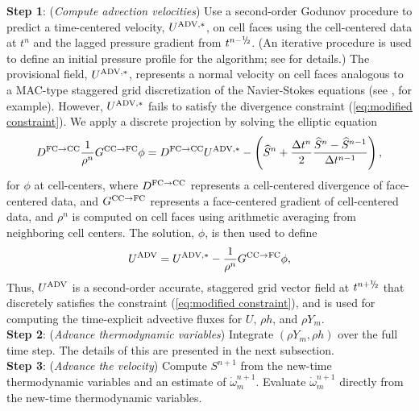 {\bf Step 1}: ({\it Compute advection velocities}) Use a second-order Godunov procedure to predict a time-centered
velocity, $U^{{\rm ADV},*}$, on cell faces using the cell-centered data at $t^n$ and the lagged pressure 
gradient from $t^{n-\myhalf}$.  
(An iterative procedure is used to define an initial pressure profile
for the algorithm; see \cite{AlmBelColHowWel98,DayBell:2000} for details.)
The provisional field, $U^{{\rm ADV},*}$, represents 
a normal velocity on cell faces analogous to a MAC-type staggered grid discretization of the 
Navier-Stokes equations (see \cite{harlowwelch}, for example).  However, $U^{{\rm ADV},*}$ fails to 
satisfy the divergence constraint (\ref{eq:modified constraint}).  We apply a discrete projection by solving the 
elliptic equation
\begin{equation}
D^{{\rm FC}\rightarrow{\rm CC}}\frac{1}{\rho^n}G^{{\rm CC}\rightarrow{\rm FC}}\phi = D^{{\rm FC}\rightarrow{\rm CC}}U^{{\rm ADV},*} - \left(\widehat S^n + \frac{\Delta t^n}{2}\frac{\widehat S^n - \widehat S^{n-1}}{\Delta t^{n-1}}\right),
\end{equation}
for $\phi$ at cell-centers, where $D^{{\rm FC}\rightarrow{\rm CC}}$ represents a cell-centered divergence of face-centered data,
and $G^{{\rm CC}\rightarrow{\rm FC}}$ represents a face-centered gradient of cell-centered data, and $\rho^n$ is computed on
cell faces using arithmetic averaging from neighboring cell centers.
The solution, $\phi$, is then used to define
\begin{equation}
U^{\rm ADV} = U^{{\rm ADV},*} - \frac{1}{\rho^n}G^{{\rm CC}\rightarrow{\rm FC}}\phi,
\end{equation}
Thus, $U^{\rm ADV}$ is a second-order accurate, staggered grid vector field at $t^{n+\myhalf}$ that discretely 
satisfies the constraint (\ref{eq:modified constraint}), and is used for computing the time-explicit 
advective fluxes for $U$, $\rho h$, and $\rho Y_m$.\\

{\bf Step 2}: ({\it Advance thermodynamic variables}) Integrate $(\rho Y_m,\rho h)$ over the full time step.  The details of this are presented in the next subsection.\\

{\bf Step 3}: ({\it Advance the velocity}) Compute $S^{n+1}$ from the new-time 
thermodynamic variables and an estimate of $\dot\omega_m^{n+1}$.  Evaluate
$\dot\omega_m^{n+1}$  directly from the new-time thermodynamic variables.

